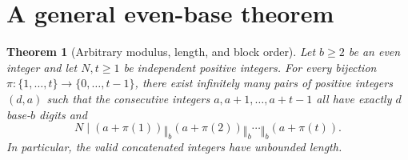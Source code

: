 \documentclass[10pt]{article}
\newtheorem{theorem}{Theorem}
\newcommand{\cat}{\mathbin{\Vert}}
\begin{document}
\section{A general even-base theorem}
\begin{theorem}[Arbitrary modulus, length, and block order]\label{thm:general}
Let $b\ge2$ be an even integer and let $N,t\ge1$ be independent
positive integers. For every bijection
$\pi:\{1,\ldots,t\}\longrightarrow\{0,\ldots,t-1\}$,
there exist infinitely many pairs of positive integers $(d,a)$ such
that the consecutive integers $a,a+1,\ldots,a+t-1$ all have
exactly $d$ base-$b$ digits and
\begin{equation}\label{eq:main}
  N\mid (a+\pi(1))\cat_b(a+\pi(2))\cat_b\cdots\cat_b(a+\pi(t)).
\end{equation}
In particular, the valid concatenated integers have unbounded length.
\end{theorem}
\end{document}
